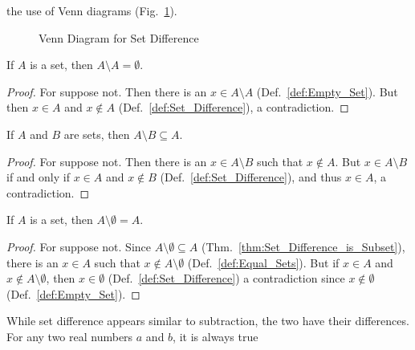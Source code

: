         the use of Venn diagrams (Fig.~\ref{fig:Set_Diff_Venn_Diagram}).
        \begin{figure}[H]
            \centering
            \captionsetup{type=figure}
            
            \caption{Venn Diagram for Set Difference}
            \label{fig:Set_Diff_Venn_Diagram}
        \end{figure}
        \begin{theorem}
            \label{thm:Set_Difference_of_Set_with_Self}%
            If $A$ is a set, then $A\setminus{A}=\emptyset$.
        \end{theorem}
        \begin{proof}
            For suppose not. Then there is an $x\in{A}\setminus{A}$
            (Def.~\ref{def:Empty_Set}). But then $x\in{A}$ and $x\notin{A}$
            (Def.~\ref{def:Set_Difference}), a contradiction.
        \end{proof}
        \begin{theorem}
            \label{thm:Set_Difference_is_Subset}%
            If $A$ and $B$ are sets, then $A\setminus{B}\subseteq{A}$.
        \end{theorem}
        \begin{proof}
            For suppose not. Then there is an $x\in{A}\setminus{B}$ such that
            $x\notin{A}$. But $x\in{A}\setminus{B}$ if and only if $x\in{A}$ and
            $x\notin{B}$ (Def.~\ref{def:Set_Difference}), and thus $x\in{A}$, a
            contradiction.
        \end{proof}
        \begin{theorem}
            \label{thm:Set_Difference_of_Set_and_Empty}%
            If $A$ is a set, then $A\setminus\emptyset=A$.
        \end{theorem}
        \begin{proof}
            For suppose not. Since $A\setminus\emptyset\subseteq{A}$
            (Thm.~\ref{thm:Set_Difference_is_Subset}), there is an $x\in{A}$
            such that $x\notin{A}\setminus\emptyset$
            (Def.~\ref{def:Equal_Sets}). But if $x\in{A}$ and
            $x\notin{A}\setminus\emptyset$, then $x\in\emptyset$
            (Def.~\ref{def:Set_Difference}) a contradiction since
            $x\notin\emptyset$ (Def.~\ref{def:Empty_Set}).
        \end{proof}
        While set difference appears similar to subtraction, the two have their
        differences. For any two real numbers $a$ and $b$, it is always true
